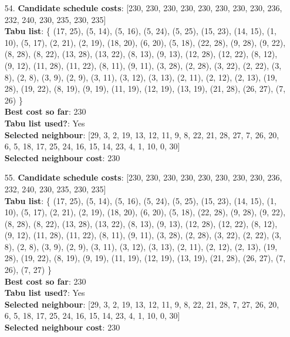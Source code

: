 \documentclass[fleqn]{article}
\begin{document}
\begin{itemize}
    \item[54.] \textbf{Candidate schedule costs}: [230, 230, 230, 230, 230, 230, 230, 230, 236, 232, 240, 230, 235, 230, 235] \\
    \textbf{Tabu list}: \{ (17, 25), (5, 14), (5, 16), (5, 24), (5, 25), (15, 23), (14, 15), (1, 10), (5, 17), (2, 21), (2, 19), (18, 20), (6, 20), (5, 18), (22, 28), (9, 28), (9, 22), (8, 28), (8, 22), (13, 28), (13, 22), (8, 13), (9, 13), (12, 28), (12, 22), (8, 12), (9, 12), (11, 28), (11, 22), (8, 11), (9, 11), (3, 28), (2, 28), (3, 22), (2, 22), (3, 8), (2, 8), (3, 9), (2, 9), (3, 11), (3, 12), (3, 13), (2, 11), (2, 12), (2, 13), (19, 28), (19, 22), (8, 19), (9, 19), (11, 19), (12, 19), (13, 19), (21, 28), (26, 27), (7, 26) \} \\
    \textbf{Best cost so far}: 230 \\
    \textbf{Tabu list used?}: Yes \\
    \textbf{Selected neighbour}: [29, 3, 2, 19, 13, 12, 11, 9, 8, 22, 21, 28, 27, 7, 26, 20, 6, 5, 18, 17, 25, 24, 16, 15, 14, 23, 4, 1, 10, 0, 30] \\
    \textbf{Selected neighbour cost}: 230
      

    \item[55.] \textbf{Candidate schedule costs}: [230, 230, 230, 230, 230, 230, 230, 230, 236, 232, 240, 230, 235, 230, 235] \\
    \textbf{Tabu list}: \{ (17, 25), (5, 14), (5, 16), (5, 24), (5, 25), (15, 23), (14, 15), (1, 10), (5, 17), (2, 21), (2, 19), (18, 20), (6, 20), (5, 18), (22, 28), (9, 28), (9, 22), (8, 28), (8, 22), (13, 28), (13, 22), (8, 13), (9, 13), (12, 28), (12, 22), (8, 12), (9, 12), (11, 28), (11, 22), (8, 11), (9, 11), (3, 28), (2, 28), (3, 22), (2, 22), (3, 8), (2, 8), (3, 9), (2, 9), (3, 11), (3, 12), (3, 13), (2, 11), (2, 12), (2, 13), (19, 28), (19, 22), (8, 19), (9, 19), (11, 19), (12, 19), (13, 19), (21, 28), (26, 27), (7, 26), (7, 27) \} \\
    \textbf{Best cost so far}: 230 \\
    \textbf{Tabu list used?}: Yes \\
    \textbf{Selected neighbour}: [29, 3, 2, 19, 13, 12, 11, 9, 8, 22, 21, 28, 7, 27, 26, 20, 6, 5, 18, 17, 25, 24, 16, 15, 14, 23, 4, 1, 10, 0, 30] \\
    \textbf{Selected neighbour cost}: 230
      


\end{itemize}
\end{document}
